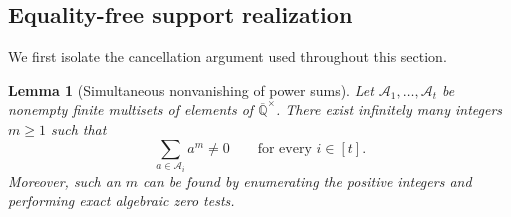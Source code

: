 \documentclass[11pt]{article}
\theoremstyle{plain}
\newtheorem{lemma}[lemma]{Lemma}
\theoremstyle{definition}
\theoremstyle{remark}
\newcommand{\AlgNums}{\overline{\mathbb Q}}
\begin{document}
\subsection{Equality-free support realization}

We first isolate the cancellation argument used throughout this section.

\begin{lemma}[Simultaneous nonvanishing of power sums]
\label{lem:simultaneous-power-sums}
Let $\mathcal A_1,\ldots,\mathcal A_t$ be nonempty finite multisets of
elements of $\AlgNums^\times$.  There exist infinitely many integers $m\ge1$
such that
\begin{equation}
  \sum_{a\in\mathcal A_i}a^m\ne0
  \qquad\text{for every }i\in[t].
  \label{eq:simultaneous-power-sums}
\end{equation}
Moreover, such an $m$ can be found by enumerating the positive integers and
performing exact algebraic zero tests.
\end{lemma}
\end{document}
